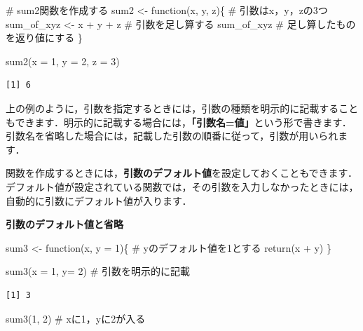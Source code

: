 \documentclass[
  letterpaper,
  DIV=11,
  numbers=noendperiod]{scrreprt}
\newenvironment{Shaded}{\begin{snugshade}}{\end{snugshade}}
\newcommand{\AttributeTok}[1]{\textcolor[rgb]{0.40,0.45,0.13}{#1}}
\newcommand{\CommentTok}[1]{\textcolor[rgb]{0.37,0.37,0.37}{#1}}
\newcommand{\ControlFlowTok}[1]{\textcolor[rgb]{0.00,0.23,0.31}{#1}}
\newcommand{\DecValTok}[1]{\textcolor[rgb]{0.68,0.00,0.00}{#1}}
\newcommand{\FunctionTok}[1]{\textcolor[rgb]{0.28,0.35,0.67}{#1}}
\newcommand{\NormalTok}[1]{\textcolor[rgb]{0.00,0.23,0.31}{#1}}
\newcommand{\OtherTok}[1]{\textcolor[rgb]{0.00,0.23,0.31}{#1}}
\newcommand{\SpecialCharTok}[1]{\textcolor[rgb]{0.37,0.37,0.37}{#1}}
\begin{document}
\begin{Shaded}
\begin{Highlighting}[]
\CommentTok{\# sum2関数を作成する}
\NormalTok{sum2 }\OtherTok{\textless{}{-}} \ControlFlowTok{function}\NormalTok{(x, y, z)\{ }\CommentTok{\# 引数はx，y，zの3つ}
\NormalTok{  sum\_of\_xyz }\OtherTok{\textless{}{-}}\NormalTok{ x }\SpecialCharTok{+}\NormalTok{ y }\SpecialCharTok{+}\NormalTok{ z }\CommentTok{\# 引数を足し算する}
\NormalTok{  sum\_of\_xyz }\CommentTok{\# 足し算したものを返り値にする}
\NormalTok{\}}

\FunctionTok{sum2}\NormalTok{(}\AttributeTok{x =} \DecValTok{1}\NormalTok{, }\AttributeTok{y =} \DecValTok{2}\NormalTok{, }\AttributeTok{z =} \DecValTok{3}\NormalTok{)}
\end{Highlighting}
\end{Shaded}

\begin{verbatim}
[1] 6
\end{verbatim}

上の例のように，引数を指定するときには，引数の種類を明示的に記載することもできます．明示的に記載する場合には，\textbf{「引数名=値」}という形で書きます．引数名を省略した場合には，記載した引数の順番に従って，引数が用いられます．

関数を作成するときには，\textbf{引数のデフォルト値}を設定しておくこともできます．デフォルト値が設定されている関数では，その引数を入力しなかったときには，自動的に引数にデフォルト値が入ります．

\textbf{引数のデフォルト値と省略}

\begin{Shaded}
\begin{Highlighting}[]
\NormalTok{sum3 }\OtherTok{\textless{}{-}} \ControlFlowTok{function}\NormalTok{(x, }\AttributeTok{y =} \DecValTok{1}\NormalTok{)\{ }\CommentTok{\# yのデフォルト値を1とする}
  \FunctionTok{return}\NormalTok{(x }\SpecialCharTok{+}\NormalTok{ y)}
\NormalTok{\}}

\FunctionTok{sum3}\NormalTok{(}\AttributeTok{x =} \DecValTok{1}\NormalTok{, }\AttributeTok{y=} \DecValTok{2}\NormalTok{) }\CommentTok{\# 引数を明示的に記載}
\end{Highlighting}
\end{Shaded}

\begin{verbatim}
[1] 3
\end{verbatim}

\begin{Shaded}
\begin{Highlighting}[]
\FunctionTok{sum3}\NormalTok{(}\DecValTok{1}\NormalTok{, }\DecValTok{2}\NormalTok{) }\CommentTok{\# xに1，yに2が入る}
\end{Highlighting}
\end{Shaded}
\end{document}
